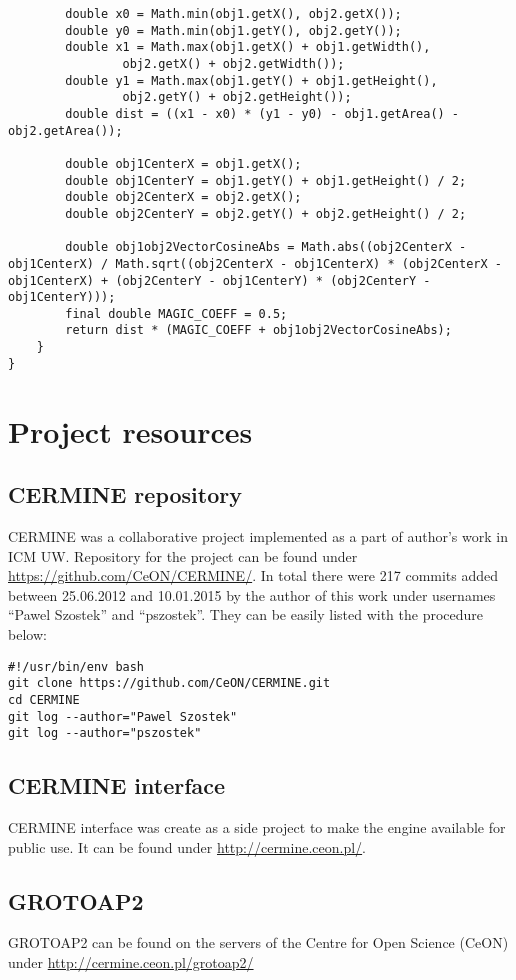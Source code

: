 \begin{appendix}
\begin{lstlisting}
        double x0 = Math.min(obj1.getX(), obj2.getX());
        double y0 = Math.min(obj1.getY(), obj2.getY());
        double x1 = Math.max(obj1.getX() + obj1.getWidth(),
                obj2.getX() + obj2.getWidth());
        double y1 = Math.max(obj1.getY() + obj1.getHeight(),
                obj2.getY() + obj2.getHeight());
        double dist = ((x1 - x0) * (y1 - y0) - obj1.getArea() - obj2.getArea());

        double obj1CenterX = obj1.getX();
        double obj1CenterY = obj1.getY() + obj1.getHeight() / 2;
        double obj2CenterX = obj2.getX();
        double obj2CenterY = obj2.getY() + obj2.getHeight() / 2;

        double obj1obj2VectorCosineAbs = Math.abs((obj2CenterX - obj1CenterX) / Math.sqrt((obj2CenterX - obj1CenterX) * (obj2CenterX - obj1CenterX) + (obj2CenterY - obj1CenterY) * (obj2CenterY - obj1CenterY)));
        final double MAGIC_COEFF = 0.5;
        return dist * (MAGIC_COEFF + obj1obj2VectorCosineAbs);
    }
}
\end{lstlisting}

\chapter{Project resources}
\section{CERMINE repository}
CERMINE was a collaborative project implemented as a part of author's work in ICM UW. Repository for the project can be found under \url{https://github.com/CeON/CERMINE/}.
In total there were 217 commits added between 25.06.2012 and 10.01.2015 by the author of this work under usernames ``Pawel Szostek'' and ``pszostek''. They can be easily listed with the procedure below:
\begin{lstlisting}
#!/usr/bin/env bash
git clone https://github.com/CeON/CERMINE.git
cd CERMINE
git log --author="Pawel Szostek"
git log --author="pszostek"
\end{lstlisting}
\section{CERMINE interface}
CERMINE interface was create as a side project to make the engine available for public use. It can be found under \url{http://cermine.ceon.pl/}.
\section{GROTOAP2}
GROTOAP2 can be found on the servers of the Centre for Open Science (CeON) under \url{http://cermine.ceon.pl/grotoap2/}

\end{appendix}